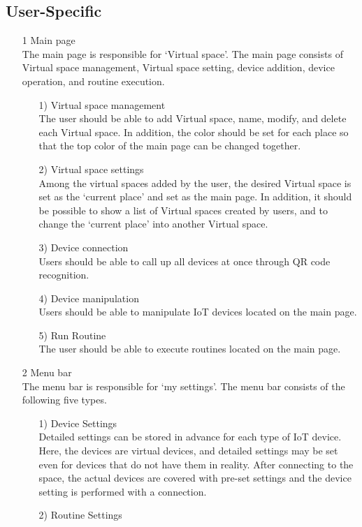 \documentclass[conference]{IEEEtran}
\begin{document}
\subsection{User-Specific}
\begin{enumerate}

\item[1] Main page \\ 
The main page is responsible for `Virtual space'. The main page consists of Virtual space management, Virtual space setting, device addition, device operation, and routine execution.
\begin{itemize}
\item [1)] Virtual space management\\
The user should be able to add Virtual space, name, modify, and delete each Virtual space. In addition, the color should be set for each place so that the top color of the main page can be changed together.
\item [2)] Virtual space settings\\
Among the virtual spaces added by the user, the desired Virtual space is set as the `current place' and set as the main page. In addition, it should be possible to show a list of Virtual spaces created by users, and to change the `current place' into another Virtual space.
\item [3)] Device connection\\
Users should be able to call up all devices at once through QR code recognition.
\item [4)] Device manipulation\\
Users should be able to manipulate IoT devices located on the main page.
\item [5)] Run Routine\\
The user should be able to execute routines located on the main page.\\
\end{itemize}

\item[2] Menu bar\\
The menu bar is responsible for `my settings'. The menu bar consists of the following five types.
\begin{itemize}
\item [1)] Device Settings\\
Detailed settings can be stored in advance for each type of IoT device. Here, the devices are virtual devices, and detailed settings may be set even for devices that do not have them in reality. After connecting to the space, the actual devices are covered with pre-set settings and the device setting is performed with a connection.
\item [2)] Routine Settings


\end{itemize}
\end{enumerate}
\end{document}
